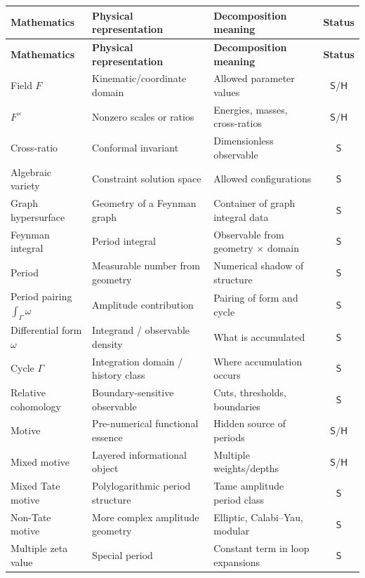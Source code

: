 \documentclass[12pt]{article}
\theoremstyle{definition}
\theoremstyle{remark}
\newcommand{\Slab}{\ensuremath{\mathsf{S}}}
\newcommand{\Hlab}{\ensuremath{\mathsf{H}}}
\begin{document}
\renewcommand{\arraystretch}{1.15}
\setlength{\tabcolsep}{4pt}
\small
\begin{longtable}{@{}L{0.26\textwidth} L{0.31\textwidth} L{0.29\textwidth} c@{}}
\toprule
\textbf{Mathematics} & \textbf{Physical representation} & \textbf{Decomposition meaning} & \textbf{Status} \\
\midrule
\endfirsthead
\toprule
\textbf{Mathematics} & \textbf{Physical representation} & \textbf{Decomposition meaning} & \textbf{Status} \\
\midrule
\endhead
\bottomrule
\endfoot
Field $F$ & Kinematic/coordinate domain & Allowed parameter values & \Slab/\Hlab \\
$F^\times$ & Nonzero scales or ratios & Energies, masses, cross-ratios & \Slab/\Hlab \\
Cross-ratio & Conformal invariant & Dimensionless observable & \Slab \\
Algebraic variety & Constraint solution space & Allowed configurations & \Slab \\
Graph hypersurface & Geometry of a Feynman graph & Container of graph integral data & \Slab \\
Feynman integral & Period integral & Observable from geometry $\times$ domain & \Slab \\
Period & Measurable number from geometry & Numerical shadow of structure & \Slab \\
Period pairing $\int_\Gamma\omega$ & Amplitude contribution & Pairing of form and cycle & \Slab \\
Differential form $\omega$ & Integrand / observable density & What is accumulated & \Slab \\
Cycle $\Gamma$ & Integration domain / history class & Where accumulation occurs & \Slab \\
Relative cohomology & Boundary-sensitive observable & Cuts, thresholds, boundaries & \Slab \\
Motive & Pre-numerical functional essence & Hidden source of periods & \Slab/\Hlab \\
Mixed motive & Layered informational object & Multiple weights/depths & \Slab/\Hlab \\
Mixed Tate motive & Polylogarithmic period structure & Tame amplitude period class & \Slab \\
Non-Tate motive & More complex amplitude geometry & Elliptic, Calabi--Yau, modular & \Slab \\
Multiple zeta value & Special period & Constant term in loop expansions & \Slab \\

\end{longtable}
\end{document}
